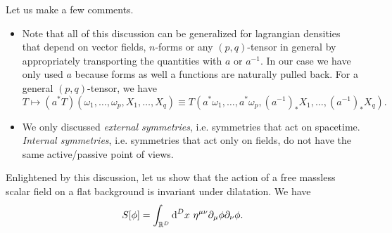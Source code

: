 \documentclass[a4paper,10pt]{article}
\begin{document}
    Let us make a few comments.
    \begin{itemize}
        \item Note that all of this discussion can be generalized for lagrangian densities that depend on vector fields, $n$-forms or any $(p,q)$-tensor in general by appropriately transporting the quantities with $a$ or $a^{-1}$. In our case we have only used $a$ because forms as well a functions are naturally pulled back. For a general $(p,q)$-tensor, we have
        \begin{equation}
            T\mapsto (a^*T)(\omega_1,\dots,\omega_p,X_1,\dots,X_q)\equiv T(a^*\omega_1,\dots,a^*\omega_p,(a^{-1})_*X_1,\dots,(a^{-1})_*X_q).
        \end{equation}
        \item We only discussed \emph{external symmetries}, i.e. symmetries that act on spacetime. \emph{Internal symmetries}, i.e. symmetries that act only on fields, do not have the same active/passive point of views.
    \end{itemize}
    
    \begin{examp}
            Enlightened by this discussion, let us show that the action of a free massless scalar field on a flat background is invariant under dilatation. We have
            \begin{equation}
                S[\phi]=\int_{\mathbb{R}^D}\text{d}^Dx~\eta^{\mu\nu}\partial_\mu\phi\partial_\nu\phi.
            \end{equation}
            
    \end{examp}

\pagebreak

\nocite{*}



\printbibliography
\end{document}
